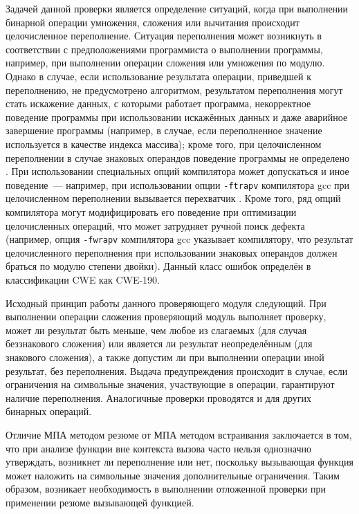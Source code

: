 Задачей данной проверки является определение ситуаций, когда при выполнении бинарной операции умножения, сложения или вычитания происходит целочисленное переполнение. Ситуация переполнения может возникнуть в соответствии с предположениями программиста о выполнении программы, например, при выполнении операции сложения или умножения по модулю. Однако в случае, если использование результата операции, приведшей к переполнению, не предусмотрено алгоритмом, результатом переполнения могут стать искажение данных, с которыми работает программа, некорректное поведение программы при использовании искажённых данных и даже аварийное завершение программы (например, в случае, если переполненное значение используется в качестве индекса массива); кроме того, при целочисленном переполнении в случае знаковых операндов поведение программы не определено \cite{c-std}. При использовании специальных опций компилятора может допускаться и иное поведение~--- например, при использовании опции \texttt{-ftrapv} компилятора gcc при целочисленном переполнении вызывается перехватчик \cite{gcc-man}. Кроме того, ряд опций компилятора могут модифицировать его поведение при оптимизации целочисленных операций, что может затрудняет ручной поиск дефекта (например, опция \texttt{-fwrapv} компилятора gcc указывает компилятору, что результат целочисленного переполнения при использовании знаковых операндов должен браться по модулю степени двойки). Данный класс ошибок определён в классификации CWE как CWE-190.

Исходный принцип работы данного проверяющего модуля следующий. При выполнении операции сложения проверяющий модуль выполняет проверку, может ли результат быть меньше, чем любое из слагаемых (для случая беззнакового сложения) или является ли результат неопределённым (для знакового сложения), а также допустим ли при выполнении операции иной результат, без переполнения. Выдача предупреждения происходит в случае, если ограничения на символьные значения, участвующие в операции, гарантируют наличие переполнения. Аналогичные проверки проводятся и для других бинарных операций.

Отличие МПА методом резюме от МПА методом встраивания заключается в том, что при анализе функции вне контекста вызова часто нельзя однозначно утверждать, возникнет ли переполнение или нет, поскольку вызывающая функция может наложить на символьные значения дополнительные ограничения. Таким образом, возникает необходимость в выполнении отложенной проверки при применении резюме вызывающей функцией.

